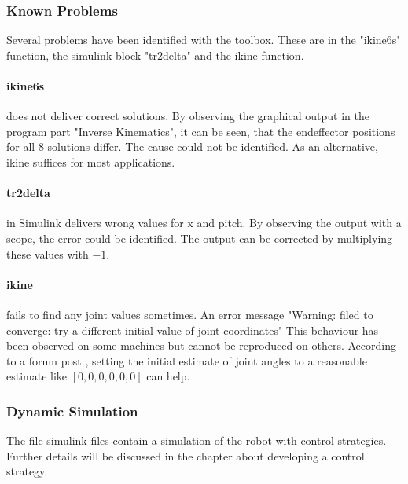 \subsubsection{Known Problems}
Several problems have been identified with the toolbox. 
These are in the "ikine6s" function, the simulink block "tr2delta" and the ikine function.

\paragraph{ikine6s} does not deliver correct solutions. By observing the graphical output in the program part "Inverse Kinematics", it can be seen, that the endeffector positions for all 8 solutions differ.  The cause could not be identified. As an alternative, ikine suffices for most applications.

\paragraph{tr2delta} in Simulink delivers wrong values for x and pitch. By observing the output with a scope, the error could be identified. The output can be corrected by multiplying these values with $-1$.

\paragraph{ikine} fails to find any joint values sometimes. An error message "Warning: filed to converge: try a different initial value of joint coordinates"  This behaviour has been observed on some machines but cannot be reproduced on others. According to a forum post \cite{ikineConverge}, setting the initial estimate of joint angles to a reasonable estimate like $[0, 0, 0, 0, 0, 0]$ can help.


 
\subsubsection{Dynamic Simulation}
The file simulink files contain a simulation of the robot with control strategies. Further details will be discussed in the chapter about developing a control strategy.



